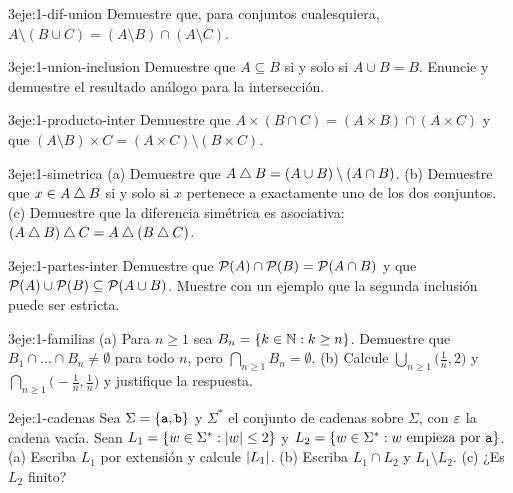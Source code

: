 \begin{ejercicio}{3}{eje:1-dif-union}
Demuestre que, para conjuntos cualesquiera, $A\setminus(B\cup C)=(A\setminus B)\cap(A\setminus C)$.
\end{ejercicio}

\begin{ejercicio}{3}{eje:1-union-inclusion}
Demuestre que $A\subseteq B$ si y solo si $A\cup B=B$. Enuncie y demuestre el resultado análogo para la intersección.
\end{ejercicio}

\begin{ejercicio}{3}{eje:1-producto-inter}
Demuestre que $A\times(B\cap C)=(A\times B)\cap(A\times C)$ y que $(A\setminus B)\times C=(A\times C)\setminus(B\times C)$.
\end{ejercicio}

\begin{ejercicio}{3}{eje:1-simetrica}
(a) Demuestre que $A\mathbin{\triangle} B=(A\cup B)\setminus(A\cap B)$. (b) Demuestre que $x\in A\mathbin{\triangle} B$ si y solo si $x$ pertenece a exactamente uno de los dos conjuntos. (c) Demuestre que la diferencia simétrica es asociativa: $(A\mathbin{\triangle} B)\mathbin{\triangle} C=A\mathbin{\triangle}(B\mathbin{\triangle} C)$.
\end{ejercicio}

\begin{ejercicio}{3}{eje:1-partes-inter}
Demuestre que $\mathcal{P}(A)\cap\mathcal{P}(B)=\mathcal{P}(A\cap B)$ y que $\mathcal{P}(A)\cup\mathcal{P}(B)\subseteq\mathcal{P}(A\cup B)$. Muestre con un ejemplo que la segunda inclusión puede ser estricta.
\end{ejercicio}

\begin{ejercicio}{3}{eje:1-familias}
(a) Para $n\ge 1$ sea $B_n=\{k\in\mathbb{N} : k\ge n\}$. Demuestre que $B_1\cap\dots\cap B_n\neq\emptyset$ para todo $n$, pero $\bigcap_{n\ge1}B_n=\emptyset$. (b) Calcule $\bigcup_{n\ge1}\bigl(\tfrac1n,2\bigr)$ y $\bigcap_{n\ge1}\bigl(-\tfrac1n,\tfrac1n\bigr)$ y justifique la respuesta.
\end{ejercicio}

\begin{ejercicio}{2}{eje:1-cadenas}
Sea $\Sigma=\{\texttt{a},\texttt{b}\}$ y $\Sigma^{*}$ el conjunto de cadenas sobre $\Sigma$, con $\varepsilon$ la cadena vacía. Sean $L_1=\{w\in\Sigma^{*}:\lvert w\rvert\le 2\}$ y $L_2=\{w\in\Sigma^{*}: w\ \text{empieza por}\ \cad{a}\}$. (a) Escriba $L_1$ por extensión y calcule $\lvert L_1\rvert$. (b) Escriba $L_1\cap L_2$ y $L_1\setminus L_2$. (c) ¿Es $L_2$ finito?
\end{ejercicio}
